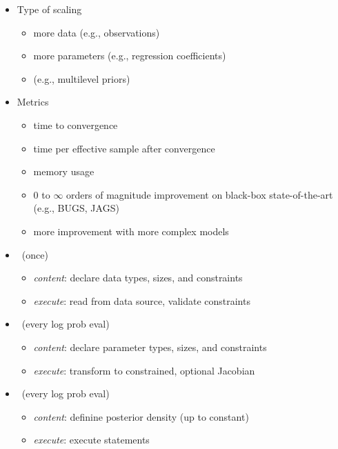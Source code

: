 \documentclass[10pt]{report}
\newcommand{\sld}[1]{\newpage{\noindent\LARGE \ \ \
    \textcolor{MidnightBlue}{\bfseries #1}}\vspace*{4pt}}
\newcommand{\myemph}[1]{{\color{MidnightBlue}{\bfseries #1}}}
\begin{document}
\sld{Scaling and Evaluation}
\begin{itemize}
\item Type of scaling
\vspace*{-4pt}
\begin{itemize}\small
\item more data (e.g., observations)
\item more parameters (e.g., regression coefficients)
\item \myemph{more complex models} (e.g., multilevel priors)
\end{itemize}
\item Metrics
\vspace*{-4pt}
\begin{itemize}\small
\item time to convergence
\item time per effective sample after convergence
\item memory usage
\vfill
\item 0 to {\large $\infty$} orders of magnitude improvement on
  black-box state-of-the-art (e.g., BUGS, JAGS)
\item more improvement with more complex models
\end{itemize}
\end{itemize}




\sld{Basic Program Blocks}

\begin{itemize}
\item \myemph{\tt\bfseries data} \ (once) 
\vspace*{-4pt}
\begin{itemize}\small
\item {\slshape content}: declare data types, sizes, and constraints
\item {\slshape execute}: read from data source, validate constraints
\end{itemize}
%
\item \myemph{\tt\bfseries parameters} \ (every log prob eval)
\vspace*{-4pt}
\begin{itemize}\small
\item {\slshape content}: declare parameter types, sizes, and constraints
\item {\slshape execute}: transform to constrained, optional Jacobian
\end{itemize}
%
\item \myemph{\tt\bfseries model} \ (every log prob eval) 
\vspace*{-4pt}
\begin{itemize}\small
\item {\slshape content}: definine posterior density (up
  to constant)
\item {\slshape execute}: execute statements
\end{itemize}
\end{itemize}
\end{document}
